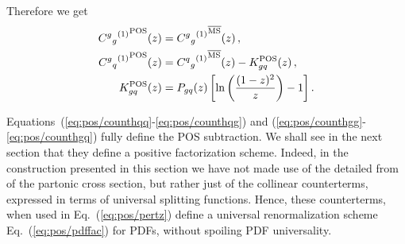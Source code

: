 Therefore we get
\begin{align}\label{eq:pos/counthgg}
 {{C^g{}_g}^{(1)}}^{\textrm{POS}}(z) &=  {{C^g{}_g}^{(1)}}^{{\overline{\textrm{MS}}}}(z) \,, \\
 {{C^g{}_q}^{(1)}}^{\textrm{POS}}(z) &=  {{C^q{}_g}^{(1)}}^{{\overline{\textrm{MS}}}}(z) - K_{gq}^{\textrm{POS}} (z) \,,\\ \label{eq:pos/counthgq}
  K_{gq}^{\textrm{POS}} (z) &=  P_{gq}(z)\left[\ln\left(\frac{(1-z)^2}{z}\right)
    - 1\right].
\end{align}

Equations~(\ref{eq:pos/counthqq}-\ref{eq:pos/counthqg}) and (\ref{eq:pos/counthgg}-\ref{eq:pos/counthgq}) 
fully define the POS subtraction. We shall see in the next section
that they define a positive factorization scheme. Indeed, in the
construction presented in this section we have not made use of the
detailed from of the partonic cross section, but rather just of the
collinear counterterms, expressed in terms of universal splitting
functions. Hence, these counterterms, when used in
Eq.~(\ref{eq:pos/pertz})  define a universal renormalization scheme
Eq.~(\ref{eq:pos/pdffac}) for PDFs, without spoiling PDF universality.

